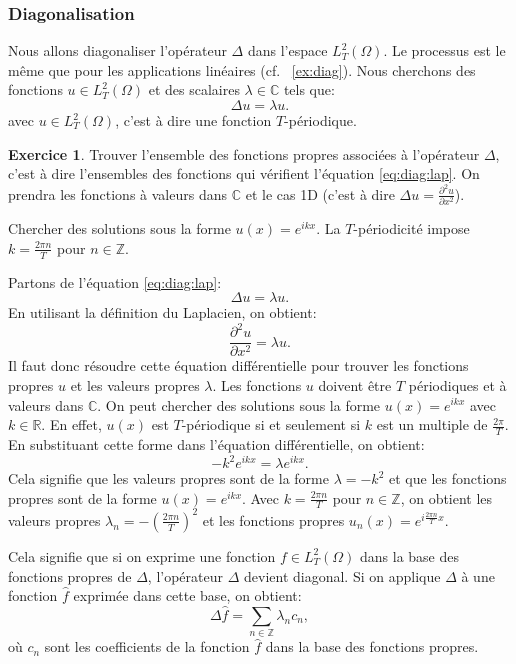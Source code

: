 \documentclass[11pt,a4paper]{article}
\numberwithin{equation}{section}
\theoremstyle{plain}
\theoremstyle{definition}
\newtheorem{exercise}[theorem]{Exercice}
\theoremstyle{remark}
\newcommand{\C}{\mathbb{C}}
\newcommand{\Z}{\mathbb{Z}}
\newcommand{\Lap}{\Delta}
\begin{document}
\subsubsection{Diagonalisation}

Nous allons diagonaliser l'opérateur $\Lap$ dans l'espace $L^2_T(\Omega)$. Le processus est le même que pour les applications linéaires (cf. ~\ref{ex:diag}).
Nous cherchons des fonctions $u \in L^2_T(\Omega)$ et des scalaires $\lambda \in \C$ tels que:
\[ \label{eq:diag:lap}
    \Lap u = \lambda u. 
\]
avec $u \in L^2_T(\Omega)$, c'est à dire une fonction $T$-périodique.

\begin{exercise}
    Trouver l'ensemble des fonctions propres associées à l'opérateur $\Lap$, c'est à dire l'ensembles des fonctions qui vérifient l'équation \eqref{eq:diag:lap}.
    On prendra les fonctions à valeurs dans $\C$ et le cas 1D (c'est à dire $\Lap u = \frac{\partial^2 u}{\partial x^2}$).
\end{exercise}

\begin{indication}
    Chercher des solutions sous la forme $u(x)=e^{ikx}$.
    La $T$-périodicité impose $k = \tfrac{2\pi n}{T}$ pour $n\in\Z$.
\end{indication}

\begin{solution}
    Partons de l'équation \eqref{eq:diag:lap}:
    \[
        \Lap u = \lambda u.
    \]
    En utilisant la définition du Laplacien, on obtient:
    \[
        \frac{\partial^2 u}{\partial x^2} = \lambda u.
    \]
    Il faut donc résoudre cette équation différentielle pour trouver les fonctions propres $u$ et les valeurs propres $\lambda$.
    Les fonctions $u$ doivent être $T$ périodiques et à valeurs dans $\C$.
    On peut chercher des solutions sous la forme $u(x) = e^{ikx}$ avec $k \in \mathbb{R}$. En effet, $u(x)$ est $T$-périodique si et seulement si $k$ est un multiple de $\frac{2\pi}{T}$.
    En substituant cette forme dans l'équation différentielle, on obtient:
    \[
        -k^2 e^{ikx} = \lambda e^{ikx}.
    \]
    Cela signifie que les valeurs propres sont de la forme $\lambda = -k^2$ et que les fonctions propres sont de la forme $u(x) = e^{ikx}$.
    Avec $k = \frac{2\pi n}{T}$ pour $n \in \mathbb{Z}$, on obtient les valeurs propres $\lambda_n = -\left(\frac{2\pi n}{T}\right)^2$ et les fonctions propres $u_n(x) = e^{i\frac{2\pi n}{T}x}$.
\end{solution}

Cela signifie que si on exprime une fonction $f \in L^2_T(\Omega)$ dans la base des fonctions propres de $\Lap$, l'opérateur $\Lap$ devient diagonal. Si on applique $\Lap$ à une fonction $\hat{f}$ exprimée dans cette base, on obtient:
\[
    \Lap \hat{f} = \sum_{n \in \mathbb{Z}} \lambda_n c_n,
\]
où $c_n$ sont les coefficients de la fonction $\hat{f}$ dans la base des fonctions propres.
\end{document}
